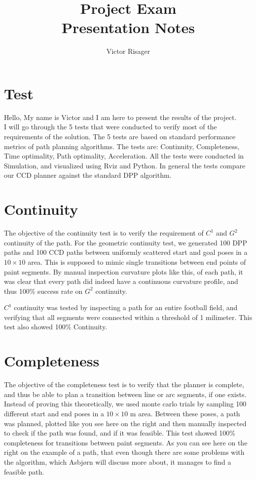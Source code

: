 \documentclass[a4paper]{article}
\title{Project Exam \\
	\large Presentation Notes}
\author{Victor Risager}
\begin{document}
\maketitle

\section{Test}
Hello, My name is Victor and I am here to present the results of the project.\\
I will go through the 5 tests that were conducted to verify most of the requirements of the solution. The 5 tests are based on standard performance metrics of path planning algorithms. The tests are: Continuity, Completeness, Time optimality, Path optimality, Acceleration. All the tests were conducted in Simulation, and visualized using Rviz and Python. In general the tests compare our CCD planner against the standard DPP algorithm. 

\section{Continuity}
The objective of the continuity test is to verify the requirement of $ C^{1} $ and $ G^{2} $ continuity of the path. For the geometric continuity test, we generated 100 DPP paths and 100 CCD paths between uniformly scattered start and goal poses in a $ 10 \times 10 $ area. This is supposed to mimic single transitions between end points of paint segments. By manual inspection curvature plots like this, of each path, it was clear that every path did indeed have a continuous curvature profile, and thus 100\% success rate on $ G^{2} $ continuity. 

$ C^{1}  $ continuity was tested by inspecting a path for an entire football field, and verifying that all segments were connected within a threshold of 1 milimeter. This test also showed 100\% Continuity.

\section{Completeness}
The objective of the completeness test is to verify that the planner is complete, and thus be able to plan a transition between line or arc segments, if one exists. Instead of proving this theoretically, we used monte carlo trials by sampling 100 different start and end poses in a $ 10 \times 10 $ m area. Between these poses, a path was planned, plotted like you see here on the right and then manually inspected to check if the path was found, and if it was feasible. This test showed  100\% completeness for transitions between paint segments. As you can see here on the right on the example of a path, that even though there are some problems with the algorithm, which Asbjørn will discuss more about, it manages to find a feasible path. 
\end{document}
